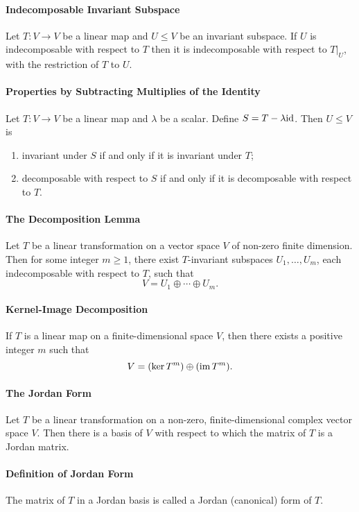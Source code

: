 \paragraph{Indecomposable Invariant Subspace}
Let \(T: V \to V\) be a linear map and \(U \leq V\) be an invariant subspace. If \(U\) is indecomposable with respect to \(T\) then it is indecomposable with respect to \(T|_U\), with the restriction of \(T\) to \(U\).

\paragraph{Properties by Subtracting Multiplies of the Identity}
Let \(T: V \to V\) be a linear map and \(\lambda\) be a scalar. Define \(S = T - \lambda\mathrm{id}\). Then \(U \leq V\) is 
\begin{enumerate}[label=\alph*)]
    \item invariant under \(S\) if and only if it is invariant under \(T\);
    \item decomposable with respect to \(S\) if and only if it is decomposable with respect to \(T\). 
\end{enumerate}

\paragraph{The Decomposition Lemma}
Let \(T\) be a linear transformation on a vector space \(V\) of non-zero finite dimension. Then for some integer \(m \geq 1\), there exist \(T\)-invariant subspaces \(U_1, \dots, U_m\), each indecomposable with respect to \(T\), such that
\[V = U_1 \oplus \cdots \oplus U_m.\]

\paragraph{Kernel-Image Decomposition}
If \(T\) is a linear map on a finite-dimensional space \(V\), then there exists a positive integer \(m\) such that 
\[V = (\ker T^m) \oplus (\operatorname{im} T^m).\]

\paragraph{The Jordan Form}
Let \(T\) be a linear transformation on a non-zero, finite-dimensional complex vector space \(V\). Then there is a basis of \(V\) with respect to which the matrix of \(T\) is a Jordan matrix. 

\paragraph{Definition of Jordan Form}
The matrix of \(T\) in a Jordan basis is called a Jordan (canonical) form of \(T\).

